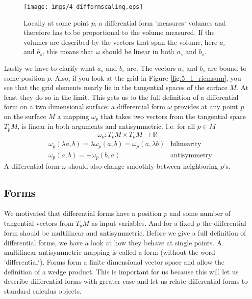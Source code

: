 \begin{figure}%
\begin{center}
	\texttt{[image: imgs/4\_difformscaling.eps]}%
\end{center}
\caption{Locally at some point $p$, a differential form 'measures` volumes and therefore has to be proportional to the volume measured. If the volumes are described by the vectors that span the volume, here $a_s$ and $b_s$, this means that $\omega$ should be linear in both $a_s$ and $b_s$.}%
\label{fig:5_linear}%
\end{figure}

Lastly we have to clarify what $a_s$ and $b_s$ are. The vectors $a_s$ and $b_s$ are bound to some position $p$. Also, if you look at the grid in Figure \ref{fig:5_1_riemsum}, you see that the grid elements nearly lie in the tangential spaces of the surface $M$. At least they do so in the limit. This gets us to the full definition of a differential form on a two dimensional surface: a differential form $\omega$ provides at any point $p$ on the surface $M$ a mapping $\omega_p$ that takes two vectors from the tangential space $T_pM$, is linear in both arguments and antisymmetric. I.e. for all $p \in M$
\[\omega_p: T_p M \times T_p M \to \mathbb R\]
\begin{align*}&\omega_p(\lambda a,b) = \lambda \omega_p(a,b) = \omega_p(a,\lambda b) &\text{bilinearity} \\
&\omega_p(a,b) = -\omega_p(b,a)  &\text{antisymmetry}\end{align*}
A differential form $\omega$ should also  change smoothly between neighboring $p$'s.


\subsection{Forms}
\label{subsec::forms}
We motivated that differential forms have a position $p$ and some number of tangential vectors from $T_pM$ as input variables. And for a fixed $p$ the differential form should be multilinear and antisymmetric.  Before we give a full definition of differential forms, we have a look at how they behave at single points. A multilinear antisymmetric mapping is called a form (without the word 'differential`). Forms form a finite dimensional vector space and allow the definition of a wedge product. This is important for us because this will let us describe differential forms with greater ease and let us relate differential forms to standard calculus objects.
